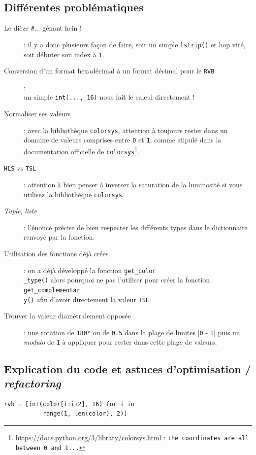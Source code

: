 \subsection*{Différentes problématiques}
\begin{description}
	\item[\textbullet{} Le dièze \og \texttt{\#}\fg{}... gênant hein !] : il y a donc plusieurs façon de faire, soit un simple \texttt{lstrip()} et hop viré, soit débuter son index à \texttt{1}.
	\item[\textbullet{} Conversion d'un format hexadécimal à un format décimal pour le \texttt{RVB}] : \\ un simple \texttt{int(..., 16)} nous fait le calcul directement !
	\item[\textbullet{} Normaliser ses valeurs] : avec la bibliothèque \texttt{colorsys}, attention à toujours rester dans un domaine de valeurs comprises entre \texttt{0} et \texttt{1}, comme stipulé dans la documentation officielle de \texttt{colorsys}\footnote{\url{https://docs.python.org/3/library/colorsys.html} : \og \texttt{the coordinates are all between 0 and 1...}\fg{}}.
	\item[\textbullet{} \texttt{HLS} vs \texttt{TSL}] : attention à bien penser à inverser la saturation de la luminosité si vous utilisez la bibliothèque \texttt{colorsys}.
	\item[\textbullet{} \textit{Tuple}, \textit{liste}] : l'énoncé précise de bien respecter les différents types dans le dictionnaire renvoyé par la fonction.
	\item[\textbullet{} Utilisation des fonctions déjà crées] : on a déjà développé la fonction \texttt{get\_color \\ \_type()} alors pourquoi ne pas l'utiliser pour créer la fonction \texttt{get\_complementar \\ y()} afin d'avoir directement la valeur \texttt{TSL}.
	\item[\textbullet{} Trouver la valeur diamétralement opposée] : une rotation de \texttt{180°} ou de \texttt{0.5} dans la plage de limites [\texttt{0} - \texttt{1}] puis un \textit{modulo} de \texttt{1} à appliquer pour rester dans cette plage de valeurs.
\end{description}
\medskip

\subsection*{Explication du code et astuces d'optimisation / \textit{refactoring}}
\begin{lstlisting}
rvb = [int(color[i:i+2], 16) for i in
           range(1, len(color), 2)]
\end{lstlisting}
\medskip

